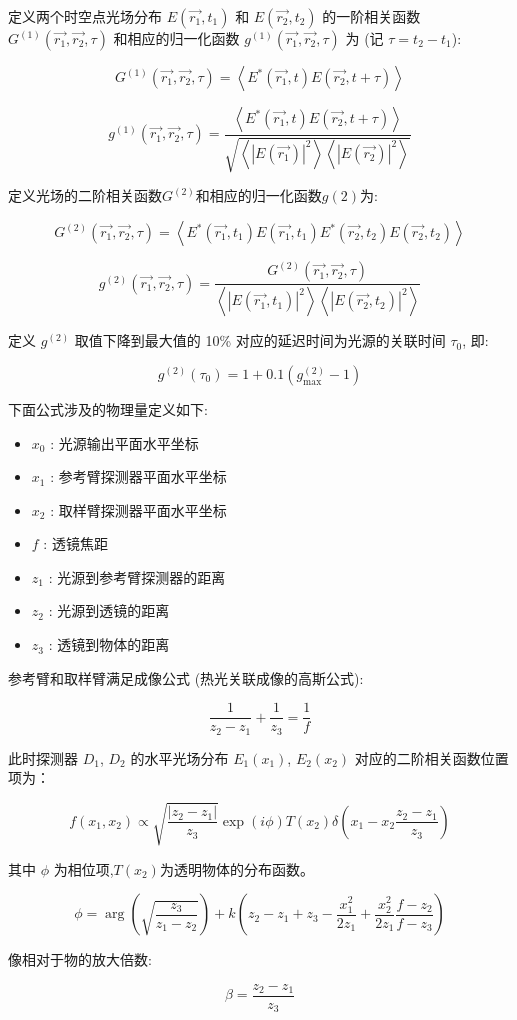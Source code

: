 \documentclass[12pt,a4paper]{article}
\newcommand{\be}[1]{
    \begin{equation}
        #1
    \end{equation}
}
\begin{document}
定义两个时空点光场分布 $E(\vec{r_1}, t_1)$ 和 $E(\vec{r_2}, t_2)$ 的一阶相关函数 $G^{(1)}(\vec{r_1},\vec{r_2}, \tau)$ 和相应的归一化函数
$g^{(1)}(\vec{r_1},\vec{r_2}, \tau)$ 为 (记 $\tau = t_2 − t_1$):
\be{G^{(1)}\left(\overrightarrow{r_{1}}, \overrightarrow{r_{2}}, \tau\right)=\left\langle E^{*}\left(\overrightarrow{r_{1}}, t\right) E\left(\overrightarrow{r_{2}}, t+\tau\right)\right\rangle}
\be{g^{(1)}\left(\overrightarrow{r_{1}}, \overrightarrow{r_{2}}, \tau\right)=\frac{\left\langle E^{*}\left(\overrightarrow{r_{1}}, t\right) E\left(\overrightarrow{r_{2}}, t+\tau\right)\right\rangle}{\sqrt{\left\langle\left|E\left(\overrightarrow{r_{1}}\right)\right|^{2}\right\rangle\left\langle\left|E\left(\overrightarrow{r_{2}}\right)\right|^{2}\right\rangle}}}
定义光场的二阶相关函数$ G^{(2)} $和相应的归一化函数$ g(2) $为:
\be{G^{(2)}\left(\overrightarrow{r_{1}}, \overrightarrow{r_{2}}, \tau\right)=\left\langle E^{*}\left(\overrightarrow{r_{1}}, t_{1}\right) E\left(\overrightarrow{r_{1}}, t_{1}\right) E^{*}\left(\overrightarrow{r_{2}}, t_{2}\right) E\left(\overrightarrow{r_{2}}, t_{2}\right)\right\rangle}
\be{g^{(2)}\left(\overrightarrow{r_{1}}, \overrightarrow{r_{2}}, \tau\right)=\frac{G^{(2)}\left(\overrightarrow{r_{1}}, \overrightarrow{r_{2}}, \tau\right)}{\left\langle\left|E\left(\overrightarrow{r_{1}}, t_{1}\right)\right|^{2}\right\rangle\left\langle\left|E\left(\overrightarrow{r_{2}}, t_{2}\right)\right|^{2}\right\rangle}}
定义 $g^{(2)}$ 取值下降到最大值的 10\% 对应的延迟时间为光源的关联时间 $\tau_0$, 即:
\be{g^{(2)}\left(\tau_{0}\right)=1+0.1\left(g_{\max }^{(2)}-1\right)}
下面公式涉及的物理量定义如下:
\begin{itemize}
\item  $x_{0}$  : 光源输出平面水平坐标
\item  $x_{1}$  : 参考臂探测器平面水平坐标
\item  $x_{2}$  : 取样臂探测器平面水平坐标
\item  $f$  : 透镜焦距
\item  $z_{1}$  : 光源到参考臂探测器的距离
\item  $z_{2}$  : 光源到透镜的距离
\item  $z_{3}$  : 透镜到物体的距离
\end{itemize}

参考臂和取样臂满足成像公式 (热光关联成像的高斯公式):
\be{\frac{1}{z_{2}-z_{1}}+\frac{1}{z_{3}}=\frac{1}{f}}

此时探测器 $D_1$, $D_2$ 的水平光场分布 $E_1(x_1)$, $E_2(x_2)$ 对应的二阶相关函数位置项为：
\be{f\left(x_{1}, x_{2}\right) \propto \sqrt{\frac{\left|z_{2}-z_{1}\right|}{z_{3}}} \exp (i \phi) T\left(x_{2}\right) \delta\left(x_{1}-x_{2} \frac{z_{2}-z_{1}}{z_{3}}\right)}
其中 $\phi$ 为相位项,$T(x_2) $为透明物体的分布函数。
\be{\phi=\arg \left(\sqrt{\frac{z_{3}}{z_{1}-z_{2}}}\right)+k\left(z_{2}-z_{1}+z_{3}-\frac{x_{1}^{2}}{2 z_{1}}+\frac{x_{2}^{2}}{2 z_{1}} \frac{f-z_{2}}{f-z_{3}}\right)}
像相对于物的放大倍数:
\be{\beta=\frac{z_{2}-z_{1}}{z_{3}}}
\end{document}
